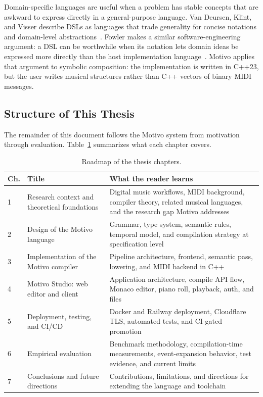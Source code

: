 Domain-specific languages are useful when a problem has stable concepts that are awkward to express directly
in a general-purpose language. Van Deursen, Klint, and Visser describe DSLs as languages that trade
generality for concise notations and domain-level abstractions~\cite{van_Deursen_Klint_Visser_2000}. Fowler
makes a similar software-engineering argument: a DSL can be worthwhile when its notation lets domain ideas be
expressed more directly than the host implementation language~\cite{Fowler_2010}. Motivo applies that
argument to symbolic composition: the implementation is written in C++23, but the user writes musical
structures rather than C++ vectors of binary MIDI messages.

\subsection{Structure of This Thesis}\label{subsec:thesis-roadmap}

The remainder of this document follows the Motivo system from motivation through evaluation.
Table~\ref{tab:thesis-roadmap} summarizes what each chapter covers.

\begin{table}[htbp]
  \centering
  \footnotesize
  \renewcommand{\arraystretch}{1.4}
  \begin{tabular}{p{1.2cm}p{4.5cm}p{7.5cm}}
    \toprule
    \textbf{Ch.} & \textbf{Title} & \textbf{What the reader learns} \\
    \midrule
    1 & Research context and theoretical foundations &
    Digital music workflows, MIDI background, compiler theory, related musical languages, and the research gap Motivo
    addresses \\
    2 & Design of the Motivo language &
    Grammar, type system, semantic rules, temporal model, and compilation strategy at specification level \\
    3 & Implementation of the Motivo compiler &
    Pipeline architecture, frontend, semantic pass, lowering, and MIDI backend in C++ \\
    4 & Motivo Studio: web editor and client &
    Application architecture, compile API flow, Monaco editor, piano roll, playback, auth, and files \\
    5 & Deployment, testing, and CI/CD &
    Docker and Railway deployment, Cloudflare TLS, automated tests, and CI-gated promotion \\
    6 & Empirical evaluation &
    Benchmark methodology, compilation-time measurements, event-expansion behavior, test evidence, and current limits \\
    7 & Conclusions and future directions &
    Contributions, limitations, and directions for extending the language and toolchain \\
    \bottomrule
  \end{tabular}
  \caption{Roadmap of the thesis chapters.}\label{tab:thesis-roadmap}
\end{table}

